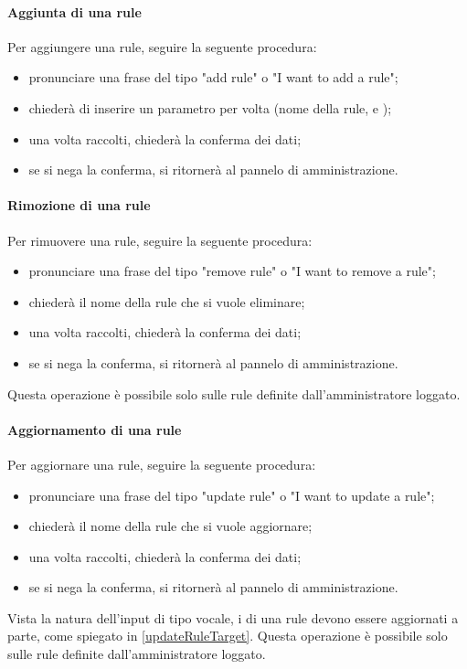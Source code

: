 \paragraph{Aggiunta di una rule}
Per aggiungere una rule, seguire la seguente procedura:
\begin{itemize}
	\item pronunciare una frase del tipo "add rule" o "I want to add a rule";
	\item \PROGETTO{} chiederà di inserire un parametro per volta (nome della rule,  e );
	\item una volta raccolti, \PROGETTO{} chiederà la conferma dei dati;
	\item se si nega la conferma, si ritornerà al pannelo di amministrazione.
\end{itemize}
\paragraph{Rimozione di una rule}
Per rimuovere una rule, seguire la seguente procedura:
\begin{itemize}
	\item pronunciare una frase del tipo "remove rule" o "I want to remove a rule";
	\item \PROGETTO{} chiederà il nome della rule che si vuole eliminare;
	\item una volta raccolti, \PROGETTO{} chiederà la conferma dei dati;
	\item se si nega la conferma, si ritornerà al pannelo di amministrazione.
\end{itemize}
Questa operazione è possibile solo sulle rule definite dall'amministratore loggato.
\paragraph{Aggiornamento di una rule}
Per aggiornare una rule, seguire la seguente procedura:
\begin{itemize}
	\item pronunciare una frase del tipo "update rule" o "I want to update a rule";
	\item \PROGETTO{} chiederà il nome della rule che si vuole aggiornare;
	\item una volta raccolti, \PROGETTO{} chiederà la conferma dei dati;
	\item se si nega la conferma, si ritornerà al pannelo di amministrazione.
\end{itemize}
Vista la natura dell'input di tipo vocale, i  di una rule devono essere aggiornati a parte, come spiegato in \ref{updateRuleTarget}.
Questa operazione è possibile solo sulle rule definite dall'amministratore loggato.
